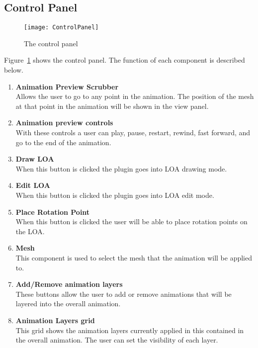 \subsection{Control Panel}
\begin{figure}[H]
\centering
\texttt{[image: ControlPanel]}
\caption{The control panel}
\label{fig:controlPanel}
\end{figure}
Figure~\ref{fig:controlPanel} shows the control panel.  The function of each component is described below.
\begin{enumerate}
	\item \textbf{Animation Preview Scrubber} \hfill \\
		Allows the user to go to any point in the animation.  The position of the mesh at that point in the animation will be shown in the view panel.
	\item \textbf{Animation preview controls} \hfill \\
		With these controls a user can play, pause, restart, rewind, fast forward, and go to the end of the animation.
	\item \textbf{Draw LOA} \hfill \\
		When this button is clicked the plugin goes into LOA drawing mode.
	\item \textbf{Edit LOA} \hfill \\
		When this button is clicked the plugin goes into LOA edit mode.
	\item \textbf{Place Rotation Point} \hfill \\
		When this button is clicked the user will be able to place rotation points on the LOA.
	\item \textbf{Mesh} \hfill \\
		This component is used to select the mesh that the animation will be applied to.
	\item \textbf{Add/Remove animation layers} \hfill \\
		These buttons allow the user to add or remove animations that will be layered into the overall animation.
	\item \textbf{Animation Layers grid} \hfill \\
		This grid shows the animation layers currently applied in this contained in the overall animation.  The user can set the visibility of each layer.
\end{enumerate}
